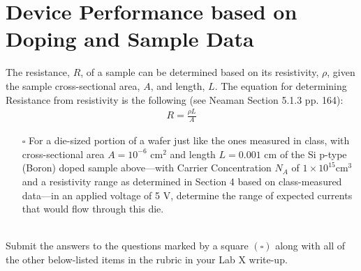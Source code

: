 \documentclass[12pt]{../manual}
\begin{document}
\section{Device Performance based on Doping and Sample Data}

The resistance, $R$, of a sample can be determined based on its resistivity, $\rho$, given the sample cross-sectional area, $A$, and length, $L$. The equation for determining Resistance from resistivity is the following (see Neaman Section 5.1.3 pp. 164):
\begin{align}
R = \frac{\rho L}{A}
\end{align}

\begin{itemize}
\item[$\square$] For a die-sized portion of a wafer just like the ones measured in class, with cross-sectional area $A = 10^{-6} \mbox{ cm}^2$ and length $L = 0.001$ cm of the Si p-type (Boron) doped sample above---with Carrier Concentration $N_A$ of $1 \times 10^{15} \mbox{cm}^3$ and a resistivity range as determined in Section 4 based on class-measured data---in an applied voltage of 5 V, determine the range of expected currents that would flow through this die.
\end{itemize}

~\\Submit the answers to the questions marked by a square $(\square)$ along with all of the other below-listed items in the rubric in your Lab X write-up. 

\newpage
{}
\end{document}

